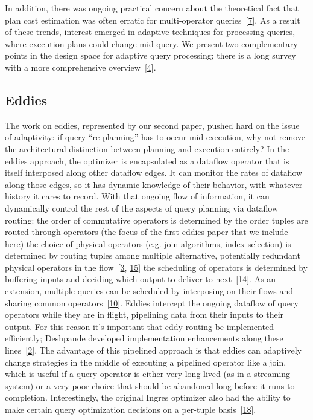 \documentclass[b5paper,11pt,twoside,openright]{book}
\begin{document}
In addition, there was ongoing practical concern about the theoretical
fact that plan cost estimation was often erratic for multi-operator
queries~{{[}\protect\hyperlink{ref-ic91}{7}{]}}. As a result of these
trends, interest emerged in adaptive techniques for processing queries,
where execution plans could change mid-query. We present two
complementary points in the design space for adaptive query processing;
there is a long survey with a more comprehensive
overview~{{[}\protect\hyperlink{ref-deshpande2007adaptive}{4}{]}}.

\hypertarget{eddies}{%
  \subsection{Eddies}\label{eddies}}

The work on eddies, represented by our second paper, pushed hard on the
issue of adaptivity: if query ``re-planning'' has to occur
mid-execution, why not remove the architectural distinction between
planning and execution entirely? In the eddies approach, the optimizer
is encapsulated as a dataflow operator that is itself interposed along
other dataflow edges. It can monitor the rates of dataflow along those
edges, so it has dynamic knowledge of their behavior, with whatever
history it cares to record. With that ongoing flow of information, it
can dynamically control the rest of the aspects of query planning via
dataflow routing: the order of commutative operators is determined by
the order tuples are routed through operators (the focus of the first
eddies paper that we include here) the choice of physical operators
(e.g. join algorithms, index selection) is determined by routing tuples
among multiple alternative, potentially redundant physical operators in
the flow~{{[}\protect\hyperlink{ref-deshpande2004lifting}{3},
  \protect\hyperlink{ref-raman2003using}{15}{]}} the scheduling of
operators is determined by buffering inputs and deciding which output to
deliver to next~{{[}\protect\hyperlink{ref-raman2002partial}{14}{]}}. As
an extension, multiple queries can be scheduled by interposing on their
flows and sharing common
operators~{{[}\protect\hyperlink{ref-madden2002continuously}{10}{]}}.
Eddies intercept the ongoing dataflow of query operators while they are
in flight, pipelining data from their inputs to their output. For this
reason it's important that eddy routing be implemented efficiently;
Deshpande developed implementation enhancements along these
lines~{{[}\protect\hyperlink{ref-deshpande2004initial}{2}{]}}. The
advantage of this pipelined approach is that eddies can adaptively
change strategies in the middle of executing a pipelined operator like a
join, which is useful if a query operator is either very long-lived (as
in a streaming system) or a very poor choice that should be abandoned
long before it runs to completion. Interestingly, the original Ingres
optimizer also had the ability to make certain query optimization
decisions on a per-tuple
basis~{{[}\protect\hyperlink{ref-wong1976decomposition}{18}{]}}.
\end{document}
